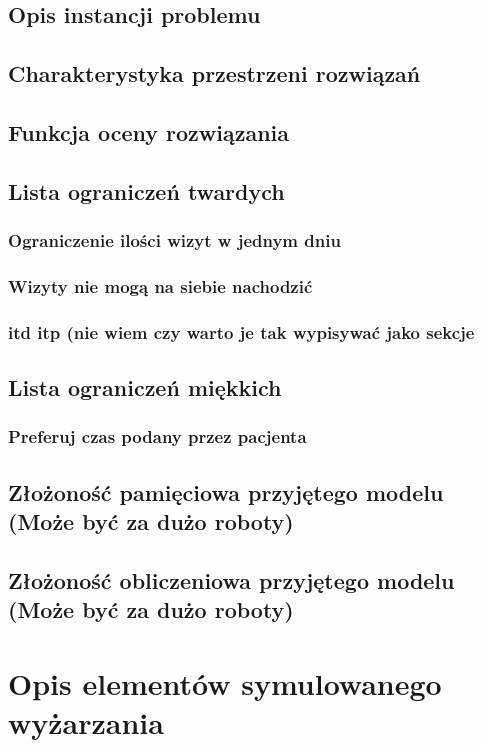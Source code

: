 \section{Opis instancji problemu}
\section{Charakterystyka przestrzeni rozwiązań}
\section{Funkcja oceny rozwiązania}
\section{Lista ograniczeń twardych \label{constraints}}
\subsection{Ograniczenie ilości wizyt w jednym dniu}
\subsection{Wizyty nie mogą na siebie nachodzić}
\subsection{itd itp (nie wiem czy warto je tak wypisywać jako sekcje}
\section{Lista ograniczeń miękkich}
\subsection{Preferuj czas podany przez pacjenta}
\section{Złożoność pamięciowa przyjętego modelu (Może być za dużo roboty)}
\section{Złożoność obliczeniowa przyjętego modelu (Może być za dużo roboty)}

\chapter{Opis elementów symulowanego wyżarzania}

